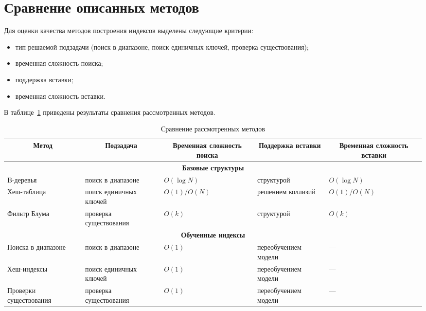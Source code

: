 

\section{Сравнение описанных методов\label{classification}}

Для оценки качества методов построения индексов выделены следующие критерии:
\begin{itemize}
    \item тип решаемой подзадачи (поиск в диапазоне, поиск единичных ключей,
        проверка существования);
    \item временная сложность поиска;
    \item поддержка вставки;
    \item временная сложность вставки.
\end{itemize}

В таблице~\ref{tab:01} приведены результаты сравнения рассмотренных методов. 
{
\fontsize{12pt}{12pt}\selectfont
\captionsetup{format=hang,justification=raggedleft,
              singlelinecheck=off,width=17cm}
\begin{longtable}[Hc]{|p{2cm}|p{3.5cm}|p{2cm}|p{3cm}|p{2cm}|}
\caption{Сравнение рассмотренных методов\label{tab:01}}\\
    \hline
    \multicolumn{1}{|c|}{\textbf{Метод}} &
    \multicolumn{1}{c|}{\textbf{Подзадача}} &
    \multicolumn{1}{c|}{\parbox{2.5cm}{\vspace{2mm}\centering\textbf{Временная
    сложность поиска}}} &
    \multicolumn{1}{c|}{\parbox{2.5cm}{\vspace{2mm}\centering\textbf{Поддержка вставки}}} &
    \multicolumn{1}{c|}{\parbox{2.5cm}{\vspace{2mm}\centering\textbf{Временная
    сложность вставки}}}\\[2.5ex]
    \hline
    \multicolumn{5}{|c|}{\textbf{Базовые структуры}}\\
    \hline
    B-деревья & поиск в диапазоне & $O(\log N)$ & структурой & $O(\log N)$\\
    \hline
    Хеш-таблица & поиск единичных ключей & $O(1)$/$O(N)$ & решением
    коллизий & $O(1)$/$O(N)$\\
    \hline
    Фильтр Блума & проверка существования& $O(k)$ & структурой & $O(k)$\\
    \hline
    \multicolumn{5}{|c|}{\textbf{Обученные индексы}}\\
    \hline
    Поиска в диапазоне& поиск в диапазоне & $O(1)$ &
    переобучением модели & ---\\
    \hline
    Хеш-индексы & поиск единичных ключей & $O(1)$ & переобучением модели & ---\\
    \hline
    Проверки существования & проверка существования & $O(1)$ & переобучением
    модели & --- \\
    \hline
\end{longtable}
}

